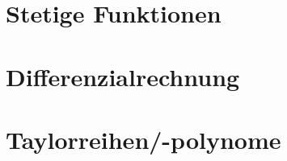 \documentclass[ngerman,12pt,a4paper
,pdftex]{article}
\theoremstyle{nodot}
\theoremstyle{nodot}
\begin{document}
\begin{onehalfspace}
        \section{Stetige Funktionen}
        
        \section{Differenzialrechnung}
        
        \section{Taylorreihen/-polynome}
        
    \end{onehalfspace}

    
\end{document}
